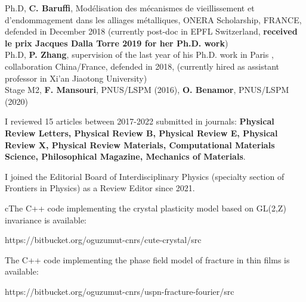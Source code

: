 \documentclass[paper=a4,fontsize=11pt]{temp} %
\begin{document}
Ph.D,  \textbf{C. Baruffi}, Modélisation des mécanismes de vieillissement et d’endommagement dans les alliages métalliques, ONERA Scholarship, FRANCE, defended in December 2018 (currently  post-doc in EPFL Switzerland,  \textbf{received  le prix Jacques Dalla Torre 2019 for her Ph.D. work})\\

Ph.D, \textbf{P. Zhang}, supervision of the last year of his Ph.D. work in Paris , collaboration China/France,  defended in  2018, (currently hired as assistant professor in Xi’an Jiaotong University)\\

Stage M2, \textbf{F. Mansouri}, PNUS/LSPM (2016), \textbf{O. Benamor},  PNUS/LSPM (2020) 

\hspace{3mm}
I reviewed  15 articles between 2017-2022 submitted in journals: \textbf{Physical Review Letters, Physical Review B, Physical Review E, Physical Review X, Physical Review Materials, Computational Materials Science, Philosophical Magazine, Mechanics of Materials}.

 I joined the Editorial Board of Interdisciplinary Physics (specialty section of Frontiers in Physics) as a Review Editor since 2021. 

cThe C++ code implementing the crystal plasticity model based on GL(2,Z) invariance is available:

https://bitbucket.org/oguzumut-cnrs/cute-crystal/src

The C++ code implementing the phase field  model of fracture in thin films   is available:

https://bitbucket.org/oguzumut-cnrs/uspn-fracture-fourier/src
\hspace{3mm}
\end{document}
